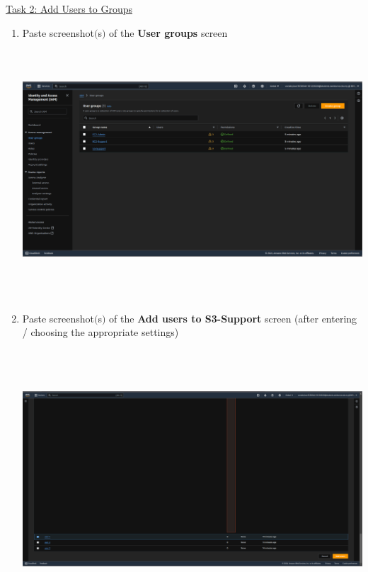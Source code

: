 \documentclass[11pt]{article}
\begin{document}
\newpage

\noindent\underline{Task 2: Add Users to Groups}
\begin{enumerate}[resume]
    \item Paste screenshot$($s$)$ of the \textbf{User groups} screen \\

    {\centering
    \includegraphics[width=6.1in, height=3.8in]{pics/3.png}
    }


    \item Paste screenshot$($s$)$ of the \textbf{Add users to S3-Support} screen (after entering / choosing the appropriate settings) \\
    \vspace{5mm}

    {\centering
    \includegraphics[width=6.1in, height=3.8in]{pics/4.png}
    }


\end{enumerate}
\end{document}
